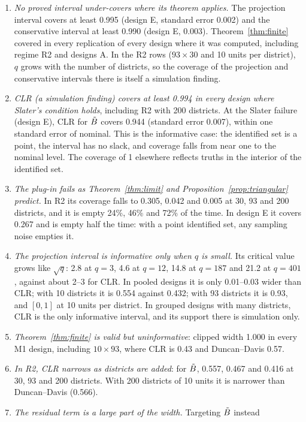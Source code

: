 \begin{enumerate}
\item \emph{No proved interval under-covers where its theorem applies.} The
projection interval covers at least 0.995 (design E, standard error 0.002) and the
conservative interval at least 0.990 (design E, 0.003). Theorem~\ref{thm:finite}
covered in every replication of every design where it was computed, including
regime R2 and designs A. In the R2 rows ($93\times30$ and 10 units per district),
$q$ grows with the number of districts, so the coverage of the projection and
conservative intervals there is itself a simulation finding.
\item \emph{CLR (a simulation finding) covers at least 0.994 in every design where
Slater's condition holds}, including R2 with 200 districts. At the Slater failure
(design E), CLR for $\tilde B$ covers 0.944 (standard error 0.007), within one standard
error of nominal. This is the informative case: the identified set is a point, the
interval has no slack, and coverage falls from near one to the nominal level. The
coverage of 1 elsewhere reflects truths in the interior of the identified set.
\item \emph{The plug-in fails as Theorem~\ref{thm:limit} and
Proposition~\ref{prop:triangular} predict.} In R2 its coverage falls to 0.305, 0.042
and 0.005 at 30, 93 and 200 districts, and it is empty 24\%, 46\% and 72\% of the
time. In design E it covers 0.267 and is empty half the time: with a point
identified set, any sampling noise empties it.
\item \emph{The projection interval is informative only when $q$ is small.} Its
critical value grows like $\sqrt q$: 2.8 at $q=3$, 4.6 at $q=12$, 14.8 at $q=187$ and
21.2 at $q=401$, against about 2--3 for CLR. In pooled designs it is only 0.01--0.03
wider than CLR; with 10 districts it is 0.554 against 0.432; with 93 districts it
is 0.93, and $[0,1]$ at 10 units per district. In grouped designs with many districts,
CLR is the only informative interval, and its support there is simulation only.
\item \emph{Theorem~\ref{thm:finite} is valid but uninformative}: clipped width
1.000 in every M1 design, including $10\times93$, where CLR is 0.43 and
Duncan--Davis 0.57.
\item \emph{In R2, CLR narrows as districts are added}: for $\tilde B$, 0.557, 0.467 and
0.416 at 30, 93 and 200 districts. With 200 districts of 10 units it is narrower
than Duncan--Davis (0.566).
\item \emph{The residual term is a large part of the width.} Targeting $\tilde B$ instead

\end{enumerate}
